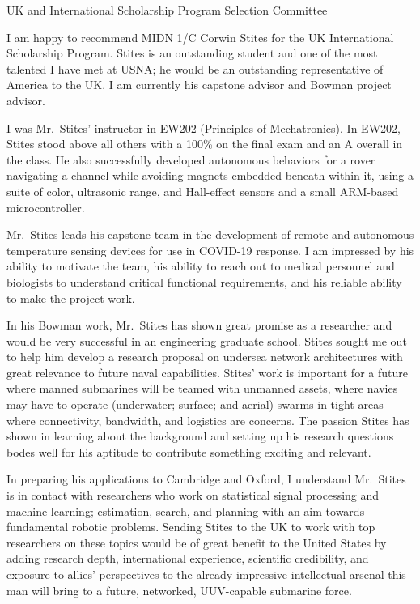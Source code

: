 \documentclass[10pt]{wrceletter}
\date{\today}
\begin{document}
\begin{letter}{%
UK and International Scholarship Program Selection Committee}

\opening{}
\raggedright %
\setlength{\parindent}{15pt} %
I am happy to recommend MIDN 1/C Corwin Stites for the UK International Scholarship Program.  Stites is an outstanding student and one of the most talented I have met at USNA; he would be an outstanding representative of America to the UK. I am currently his capstone advisor and Bowman project advisor. 

I was Mr.~Stites' instructor in EW202 (Principles of Mechatronics).  In EW202, Stites stood above all others with a 100\% on the final exam and an A overall in the class. He also successfully developed autonomous behaviors for a rover navigating a channel while avoiding magnets embedded beneath within it, using a suite of color, ultrasonic range, and Hall-effect sensors and a small ARM-based microcontroller. 

Mr.~Stites leads his capstone team in the development of remote and autonomous temperature sensing devices for use in COVID-19 response. I am impressed by his ability to motivate the team, his ability to reach out to medical personnel and biologists to understand critical functional requirements, and his reliable ability to make the project work. 

In his Bowman work, Mr.~Stites has shown great promise as a researcher and would be very successful in an engineering graduate school. Stites sought me out to help him develop a research proposal on undersea network architectures with great relevance to future naval capabilities. Stites' work is important for a future where manned submarines will be teamed with unmanned assets, where navies may have to operate (underwater; surface; and aerial) swarms in tight areas where connectivity, bandwidth, and logistics are concerns. The passion Stites has shown in learning about the background and setting up his research questions bodes well for his aptitude to contribute something exciting and relevant. 

In preparing his applications to Cambridge and Oxford, I understand Mr.~Stites is in contact with researchers who work on statistical signal processing and machine learning; estimation, search, and planning with an aim towards fundamental robotic problems. Sending Stites to the UK to work with top researchers on these topics would be of great benefit to the United States by adding research depth, international experience, scientific credibility, and exposure to allies' perspectives to the already impressive intellectual arsenal this man will bring to a future, networked, UUV-capable submarine force. 

\closing{~} %

\end{letter}
\end{document}
